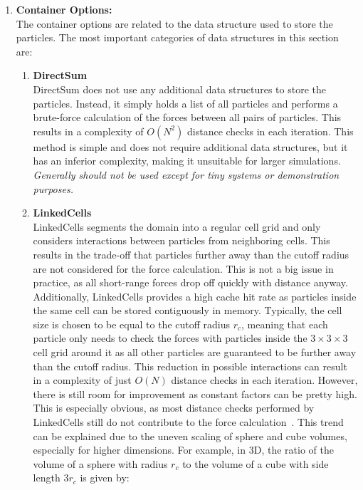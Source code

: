 \begin{enumerate}[label=\textbf{\arabic*.}]
      \item \textbf{Container Options:} \\
            The container options are related to the data structure used to store the particles. The most important categories of data structures in this section are:
            \begin{enumerate}
                  \item \textbf{DirectSum} \\
                        DirectSum does not use any additional data structures to store the particles. Instead, it simply holds a list of all particles and performs a brute-force calculation of the forces between all pairs of particles. This results in a complexity of $O(N^2)$ distance checks in each iteration. This method is simple and does not require additional data structures, but it has an inferior complexity, making it unsuitable for larger simulations. \textit{Generally should not be used except for tiny systems or demonstration purposes.~\cite{VICCIONE2008625}}
                  \item \textbf{LinkedCells} \\
                        LinkedCells segments the domain into a regular cell grid and only considers interactions between particles from neighboring cells. This results in the trade-off that particles further away than the cutoff radius are not considered for the force calculation. This is not a big issue in practice, as all short-range forces drop off quickly with distance anyway. Additionally, LinkedCells provides a high cache hit rate as particles inside the same cell can be stored contiguously in memory. Typically, the cell size is chosen to be equal to the cutoff radius $r_c$, meaning that each particle only needs to check the forces with particles inside the $3\times3\times3$ cell grid around it as all other particles are guaranteed to be further away than the cutoff radius. This reduction in possible interactions can result in a complexity of just $O(N)$ distance checks in each iteration. However, there is still room for improvement as constant factors can be pretty high. This is especially obvious, as most distance checks performed by LinkedCells still do not contribute to the force calculation~\cite{GRATL2019748}. This trend can be explained due to the uneven scaling of sphere and cube volumes, especially for higher dimensions. For example, in 3D, the ratio of the volume of a sphere with radius $r_c$ to the volume of a cube with side length $3r_c$ is given by:


\end{enumerate}
\end{enumerate}
